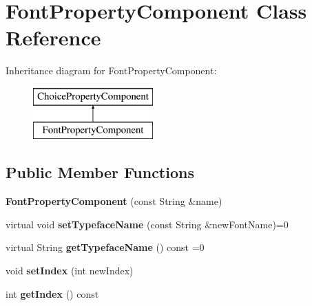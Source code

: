 \hypertarget{class_font_property_component}{\section{Font\-Property\-Component Class Reference}
\label{class_font_property_component}
}
Inheritance diagram for Font\-Property\-Component\-:\begin{figure}[H]
\begin{center}
\leavevmode
\includegraphics[height=2.000000cm]{class_font_property_component}
\end{center}
\end{figure}
\subsection*{Public Member Functions}
\begin{DoxyCompactItemize}
\item 
\hypertarget{class_font_property_component_a47de1b91d7384af600c0c9cb4e41ca03}{{\bfseries Font\-Property\-Component} (const String \&name)}\label{class_font_property_component_a47de1b91d7384af600c0c9cb4e41ca03}

\item 
\hypertarget{class_font_property_component_a31e0cf1899d88abecfa989559dafa9f1}{virtual void {\bfseries set\-Typeface\-Name} (const String \&new\-Font\-Name)=0}\label{class_font_property_component_a31e0cf1899d88abecfa989559dafa9f1}

\item 
\hypertarget{class_font_property_component_a8de426b0fef660d4e028fc77e8d4ae08}{virtual String {\bfseries get\-Typeface\-Name} () const =0}\label{class_font_property_component_a8de426b0fef660d4e028fc77e8d4ae08}

\item 
\hypertarget{class_font_property_component_ab9d8f5b104b1702b1e38cf70af7ade9b}{void {\bfseries set\-Index} (int new\-Index)}\label{class_font_property_component_ab9d8f5b104b1702b1e38cf70af7ade9b}

\item 
\hypertarget{class_font_property_component_a395aacef9bf0ab9911c061a1f21d0887}{int {\bfseries get\-Index} () const }\label{class_font_property_component_a395aacef9bf0ab9911c061a1f21d0887}

\end{DoxyCompactItemize}
